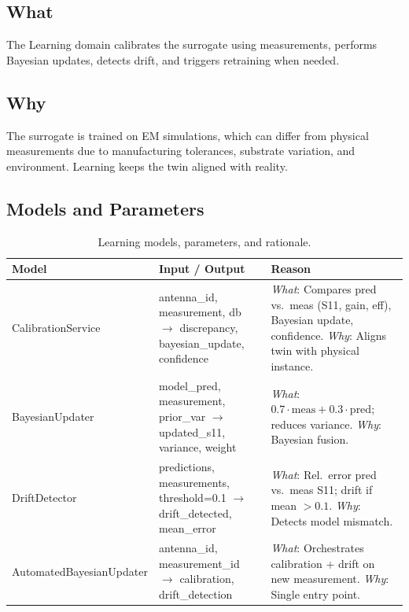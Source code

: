 \documentclass[11pt,a4paper]{article}
\begin{document}
\subsection{What}
The Learning domain calibrates the surrogate using measurements, performs Bayesian updates, detects drift, and triggers retraining when needed.

\subsection{Why}
The surrogate is trained on EM simulations, which can differ from physical measurements due to manufacturing tolerances, substrate variation, and environment. Learning keeps the twin aligned with reality.

\subsection{Models and Parameters}

\begin{table}[htbp]
\centering
\small
\begin{tabularx}{\textwidth}{@{}lXX@{}}
\toprule
\textbf{Model} & \textbf{Input / Output} & \textbf{Reason} \\
\midrule
CalibrationService & antenna\_id, measurement, db $\to$ discrepancy, bayesian\_update, confidence & \emph{What}: Compares pred vs.\ meas (S11, gain, eff), Bayesian update, confidence. \emph{Why}: Aligns twin with physical instance. \\
\addlinespace
BayesianUpdater & model\_pred, measurement, prior\_var $\to$ updated\_s11, variance, weight & \emph{What}: $0.7\cdot\text{meas}+0.3\cdot\text{pred}$; reduces variance. \emph{Why}: Bayesian fusion. \\
\addlinespace
DriftDetector & predictions, measurements, threshold=0.1 $\to$ drift\_detected, mean\_error & \emph{What}: Rel.\ error pred vs.\ meas S11; drift if mean $>0.1$. \emph{Why}: Detects model mismatch. \\
\addlinespace
AutomatedBayesianUpdater & antenna\_id, measurement\_id $\to$ calibration, drift\_detection & \emph{What}: Orchestrates calibration + drift on new measurement. \emph{Why}: Single entry point. \\
\bottomrule
\end{tabularx}
\caption{Learning models, parameters, and rationale.}
\end{table}
\end{document}
